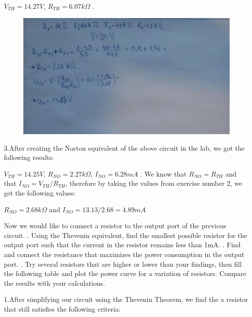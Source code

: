 {\begin{solution}
		$V_{TH}=14.27V$, $R_{TH}=6.07k\Omega$
		. 
		\begin{figure}[h!]
			\centering
			\includegraphics[width=1\textwidth]{images/calc222.jpg}
		\end{figure}
		\newline
		3.After creating the Norton equivalent of the above circuit in the lab, we got the following results:
		
		$V_{TH}=14.25V$, $R_{NO}=2.27k\Omega$, $I_{NO}=6.28mA$
		. We know that $R_{NO}=R_{TH}$ and that $I_{NO}=V_{TH}/R_{TH}$, therefore by taking the values from exercise number 2, we get the following values:
		
		$R_{NO}=2.68k\Omega$ and $I_{NO}=13.13/2.68=4.89mA$
		
	\end{solution}
	\clearpage
	\begin{problem}
		Now we would like to connect a resistor to the output port of the previous circuit.
		. Using the Thevenin equivalent, find the smallest possible resistor for the output port such that the current in the resistor remains less than 1mA.
		. Find and connect the resistance that maximizes the power consumption in the output port.
		. Try several resistors that are higher or lower than your findings, then fill the following table and plot the power curve for a variation of resistors. Compare the results with your calculations.
	\end{problem}
	
	\begin{solution}
		1.After simplifying our circuit using the Thevenin Theorem, we find the a resistor that still satisfies the following criteria:
		

\end{solution}}
